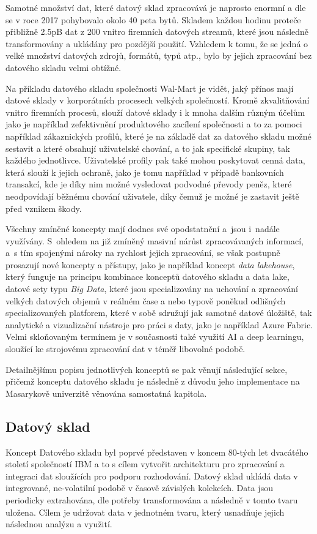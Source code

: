 \documentclass[
  digital,     %
  twoside,     %
  lof,         %
  lot,         %
]{fithesis4}
\begin{document}
Samotné množství dat, které datový sklad zpracovává je naprosto enormní a dle \citeauthor{Marr2017} se v roce 2017 pohybovalo okolo 40 peta bytů. Skladem každou hodinu proteče přibližně 2.5pB dat z 200 vnitro firemních datových streamů, které jsou následně transformovány a ukládány pro pozdější použití.\parencite{Marr2017} Vzhledem k tomu, že se jedná o velké množství datových zdrojů, formátů, typů atp., bylo by jejich zpracování bez datového skladu velmi obtížné.

Na příkladu datového skladu společnosti Wal-Mart je vidět, jaký přínos mají datové sklady v korporátních procesech velkých společností. Kromě zkvalitňování vnitro firemních procesů, slouží datové sklady i k mnoha dalším různým účelům jako je například zefektivnění produktového zacílení společnosti a to za pomoci například zákaznických profilů, které je na základě dat za datového skladu možné sestavit a které obsahují uživatelské chování, a to jak specifické skupiny, tak každého jednotlivce. Uživatelské profily pak také mohou poskytovat cenná data, která slouží k jejich ochraně, jako je tomu například v případě bankovních transakcí, kde je díky nim možné vysledovat podvodné převody peněz, které neodpovídají běžnému chování uživatele, díky čemuž je možné je zastavit ještě před vznikem škody.\parencite{Inmon2008}

Všechny zmíněné koncepty mají dodnes své opodstatnění a jsou i nadále využívány. S ohledem na již zmíněný masivní nárůst zpracovávaných informací, a s tím spojenými nároky na rychlost jejich zpracování, se však postupně prosazují nové koncepty a přístupy, jako je například koncept \emph{data lakehouse}, který funguje na principu kombinace konceptů datového skladu a data lake, datové sety typu \emph{Big Data}, které jsou specializovány na uchování a zpracování velkých datových objemů v reálném čase a nebo typově poněkud odlišných specializovaných platforem, které v sobě sdružují jak samotné datové úložiště, tak analytické a vizualizační nástroje pro práci s daty, jako je například Azure Fabric. Velmi skloňovaným termínem je v současnosti také využití AI a deep learningu, sloužící ke strojovému zpracování dat v téměř libovolné podobě.  

Detailnějšímu popisu jednotlivých konceptů se pak věnují následující sekce, přičemž konceptu datového skladu je následně z důvodu jeho implementace na Masarykově univerzitě věnována samostatná kapitola.

\subsection{Datový sklad}
Koncept Datového skladu byl poprvé představen v koncem 80-tých let dvacátého století společností IBM a to s cílem vytvořit architekturu pro zpracování a integraci dat sloužících pro podporu rozhodování. Datový sklad ukládá data v integrované, ne-volatilní podobě v časově závislých kolekcích. Data jsou periodicky extrahována, dle potřeby transformována a následně v tomto tvaru uložena. Cílem je udržovat data v jednotném tvaru, který usnadňuje jejich následnou analýzu a využití.\parencite[s.~3]{Nambiar2022}
\end{document}

